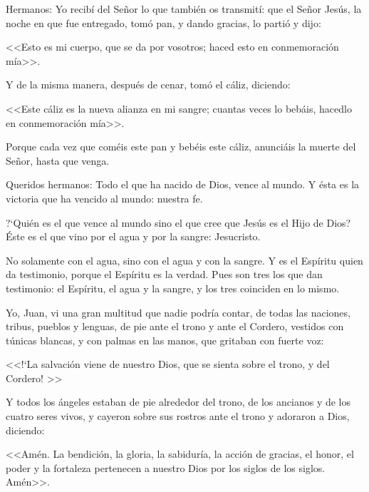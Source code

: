 
 Hermanos: Yo recibí del Señor lo que también 
os transmití: que el Señor Jesús, la noche en 
que fue entregado, tomó pan, y dando gracias, 
lo partió y dijo:

 <<Esto es mi cuerpo, que se da 
por vosotros; haced esto en conmemoración 
mía>>. 

Y de la misma manera, después de 
cenar, tomó el cáliz, diciendo: 

<<Este cáliz es la 
nueva alianza en mi sangre; cuantas veces lo 
bebáis, hacedlo en conmemoración mía>>. 

Porque cada vez que coméis este pan y bebéis 
este cáliz, anunciáis la muerte del Señor, hasta 
que venga. 


 Queridos hermanos: Todo el que ha nacido de 
Dios, vence al mundo. Y ésta es la victoria que 
ha vencido al mundo: nuestra fe.

?`Quién es el 
que vence al mundo sino el que cree que Jesús 
es el Hijo de Dios? Éste es el que vino por el 
agua y por la sangre: Jesucristo. 

No solamente 
con el agua, sino con el agua y con la sangre. Y 
es el Espíritu quien da testimonio, porque el 
Espíritu es la verdad. Pues son tres los que dan 
testimonio: el Espíritu, el agua y la sangre, y 
los tres coinciden en lo mismo. 



Yo, Juan, vi una gran multitud que nadie 
podría contar, de todas las naciones, tribus, 
pueblos y lenguas, de pie ante el trono y ante 
el Cordero, vestidos con túnicas blancas, y con 
palmas en las manos, que gritaban con fuerte 
voz: 

<<!`La salvación viene de nuestro Dios, que 
se sienta sobre el trono, y del Cordero! >>

Y 
todos los ángeles estaban de pie alrededor del 
trono, de los ancianos y de los cuatro seres 
vivos, y cayeron sobre sus rostros ante el trono 
y adoraron a Dios, diciendo:

 <<Amén. La 
bendición, la gloria, la sabiduría, la acción de 
gracias, el honor, el poder y la fortaleza 
pertenecen a nuestro Dios por los siglos de los 
siglos. Amén>>. 


